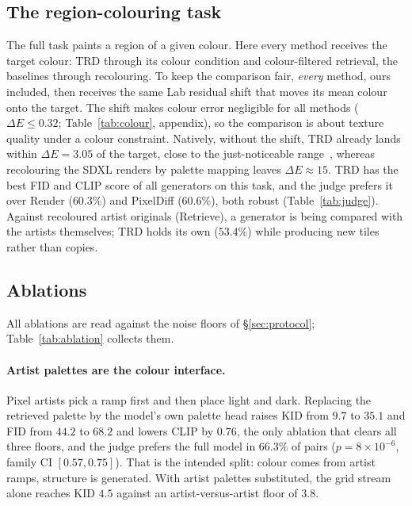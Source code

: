 \documentclass{article}
\newcommand{\trd}{\textsc{TRD}}
\begin{document}
\subsection{The region-colouring task}

The full task paints a region of a given colour. Here every method receives the
target colour: \trd{} through its colour condition and colour-filtered
retrieval, the baselines through recolouring. To keep the comparison fair,
\emph{every} method, ours included, then receives the same Lab residual shift
that moves its mean colour onto the target. The shift makes colour error
negligible for all methods ($\Delta E\le0.32$; Table~\ref{tab:colour},
appendix), so the comparison is about texture quality under a colour
constraint. Natively,
without the shift, \trd{} already lands within $\Delta E=3.05$ of the target,
close to the just-noticeable range~\citep{sharma2005ciede2000}, whereas
recolouring the SDXL renders by palette mapping leaves $\Delta E\approx15$.
\trd{} has the best FID and CLIP score of all generators on this task, and the
judge prefers it over Render ($60.3\%$) and PixelDiff ($60.6\%$), both robust
(Table~\ref{tab:judge}). Against recoloured artist originals (Retrieve), a
generator is being compared with the artists themselves; \trd{} holds its
own ($53.4\%$) while producing new tiles rather than copies.

\subsection{Ablations}
\label{sec:ablation}

All ablations are read against the noise floors of \S\ref{sec:protocol};
Table~\ref{tab:ablation} collects them.

\paragraph{Artist palettes are the colour interface.} Pixel artists pick a
ramp first and then place light and dark. Replacing the retrieved palette by
the model's own palette head raises KID from $9.7$ to $35.1$ and FID from
$44.2$ to $68.2$ and lowers CLIP by $0.76$, the only ablation that clears all
three floors, and the judge prefers the full model in $66.3\%$ of pairs
($p=8\times10^{-6}$, family CI $[0.57,0.75]$). That is the intended split:
colour comes from artist ramps, structure is generated. With artist palettes
substituted, the grid stream alone reaches KID $4.5$ against an
artist-versus-artist floor of $3.8$.
\end{document}

